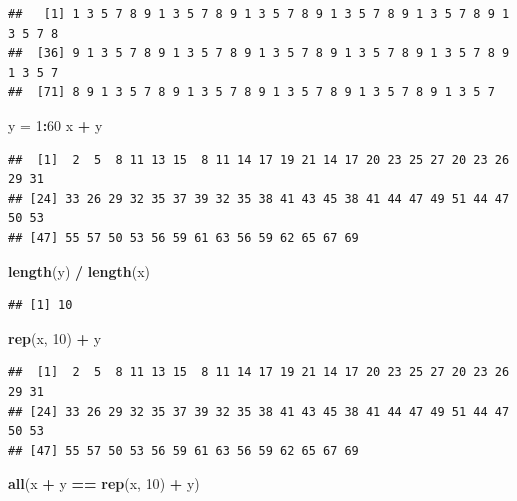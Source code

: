 \documentclass[]{book}
\newenvironment{Shaded}{\begin{snugshade}}{\end{snugshade}}
\newcommand{\KeywordTok}[1]{\textcolor[rgb]{0.13,0.29,0.53}{\textbf{#1}}}
\newcommand{\DecValTok}[1]{\textcolor[rgb]{0.00,0.00,0.81}{#1}}
\newcommand{\StringTok}[1]{\textcolor[rgb]{0.31,0.60,0.02}{#1}}
\newcommand{\OperatorTok}[1]{\textcolor[rgb]{0.81,0.36,0.00}{\textbf{#1}}}
\newcommand{\NormalTok}[1]{#1}
\theoremstyle{definition}
\theoremstyle{definition}
\theoremstyle{definition}
\theoremstyle{remark}
\begin{document}
\begin{verbatim}
##   [1] 1 3 5 7 8 9 1 3 5 7 8 9 1 3 5 7 8 9 1 3 5 7 8 9 1 3 5 7 8 9 1 3 5 7 8
##  [36] 9 1 3 5 7 8 9 1 3 5 7 8 9 1 3 5 7 8 9 1 3 5 7 8 9 1 3 5 7 8 9 1 3 5 7
##  [71] 8 9 1 3 5 7 8 9 1 3 5 7 8 9 1 3 5 7 8 9 1 3 5 7 8 9 1 3 5 7
\end{verbatim}

\begin{Shaded}
\begin{Highlighting}[]
\NormalTok{y =}\StringTok{ }\DecValTok{1}\OperatorTok{:}\DecValTok{60}
\NormalTok{x }\OperatorTok{+}\StringTok{ }\NormalTok{y}
\end{Highlighting}
\end{Shaded}

\begin{verbatim}
##  [1]  2  5  8 11 13 15  8 11 14 17 19 21 14 17 20 23 25 27 20 23 26 29 31
## [24] 33 26 29 32 35 37 39 32 35 38 41 43 45 38 41 44 47 49 51 44 47 50 53
## [47] 55 57 50 53 56 59 61 63 56 59 62 65 67 69
\end{verbatim}

\begin{Shaded}
\begin{Highlighting}[]
\KeywordTok{length}\NormalTok{(y) }\OperatorTok{/}\StringTok{ }\KeywordTok{length}\NormalTok{(x)}
\end{Highlighting}
\end{Shaded}

\begin{verbatim}
## [1] 10
\end{verbatim}

\begin{Shaded}
\begin{Highlighting}[]
\KeywordTok{rep}\NormalTok{(x, }\DecValTok{10}\NormalTok{) }\OperatorTok{+}\StringTok{ }\NormalTok{y}
\end{Highlighting}
\end{Shaded}

\begin{verbatim}
##  [1]  2  5  8 11 13 15  8 11 14 17 19 21 14 17 20 23 25 27 20 23 26 29 31
## [24] 33 26 29 32 35 37 39 32 35 38 41 43 45 38 41 44 47 49 51 44 47 50 53
## [47] 55 57 50 53 56 59 61 63 56 59 62 65 67 69
\end{verbatim}

\begin{Shaded}
\begin{Highlighting}[]
\KeywordTok{all}\NormalTok{(x }\OperatorTok{+}\StringTok{ }\NormalTok{y }\OperatorTok{==}\StringTok{ }\KeywordTok{rep}\NormalTok{(x, }\DecValTok{10}\NormalTok{) }\OperatorTok{+}\StringTok{ }\NormalTok{y)}
\end{Highlighting}
\end{Shaded}
\end{document}
